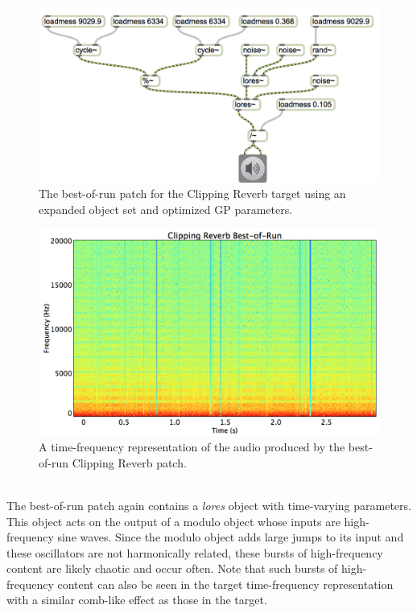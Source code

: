 \documentclass[a4paper,12pt]{report} 	%
\numberwithin{figure}{chapter}
\numberwithin{table}{chapter}
\numberwithin{equation}{chapter}
\begin{document}
\begin{flushleft}
\begin{figure}[h!]
\begin{center}
\includegraphics[width=\linewidth]{ClippingReverb_Best}
\caption[Clipping Reverb Best-of-Run Patch]{The best-of-run patch for the Clipping Reverb target using an expanded object set and optimized GP parameters.}
\end{center}
\end{figure}
\begin{figure}[h!]
\begin{center}
\includegraphics[scale=0.35,width=\linewidth]{ClippingReverbBestOfRunSTFT}
\caption[Best-of-Run Clipping Reverb Time-Frequency Representation]{A time-frequency representation of the audio produced by the best-of-run Clipping Reverb patch.}
\end{center}
\end{figure}
\\

The best-of-run patch again contains a \emph{lores\texttildelow{}} object with time-varying parameters. This object acts on the output of a modulo object whose inputs are high-frequency sine waves. Since the modulo object adds large jumps to its input and these oscillators are not harmonically related, these bursts of high-frequency content are likely chaotic and occur often. Note that such bursts of high-frequency content can also be seen in the target time-frequency representation with a similar comb-like effect as those in the target.


\end{flushleft}
\end{document}
